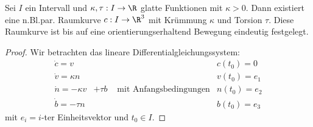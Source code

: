 \documentclass{mycourse}
\begin{document}
\begin{st}
\label{7.9}
Sei $I$ ein Intervall und $\kappa , \tau : I \to \R$ glatte Funktionen mit $\kappa > 0$. Dann existiert eine n.Bl.par. Raumkurve $c: I \to \R^3$ mit Krümmung $\kappa$ und Torsion $\tau$. Diese Raumkurve ist bis auf eine orientierungserhaltend Bewegung eindeutig festgelegt.
\begin{proof}
Wir betrachten das lineare Differentialgleichungssystem: 
\[ \begin{matrix} \dot c = v~~ & & & c(t_0) = 0 \\ 
\dot v = \kappa n~ & & & v(t_0) = e_1       \\
\dot n = - \kappa v & + \tau b & \text{ mit Anfangsbedingungen} & n(t_0) = e_2  \\
\dot b = - \tau n & & & b(t_0) = e_3 
\end{matrix}    \]
mit $e_i = i$-ter Einheitsvektor und $t_0 \in I$. 


\end{proof}
\end{st}
\end{document}
